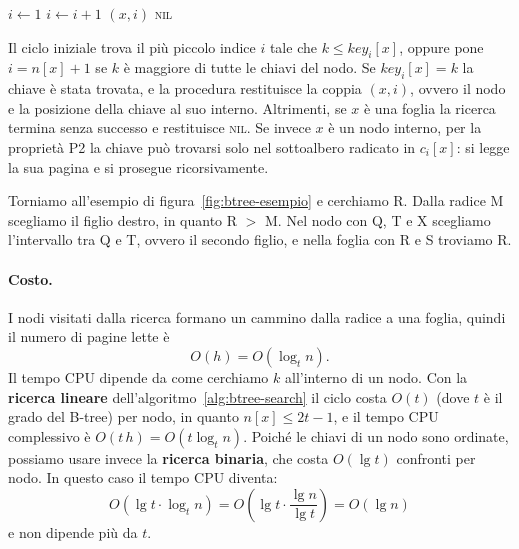 \begin{algorithm}[htbp]
\caption{La ricerca di $k$ nel sottoalbero radicato in $x$. La chiamata iniziale è \BTreeSearch$(\mathit{root}[T],k)$.}\label{alg:btree-search}
\begin{algorithmic}[1]
  \State $i \gets 1$
    \State $i \gets i+1$
  \EndWhile
    \State \Return $(x,i)$
  \EndIf
    \State \Return \textsc{nil}
  \EndIf
  \State {}
  \State \Return {}
\EndProcedure
\end{algorithmic}
\end{algorithm}

Il ciclo iniziale trova il più piccolo indice $i$ tale che $k \le \mathit{key}_i[x]$, oppure pone $i = n[x]+1$ se $k$ è maggiore di tutte le chiavi del nodo. Se $\mathit{key}_i[x] = k$ la chiave è stata trovata, e la procedura restituisce la coppia $(x,i)$, ovvero il nodo e la posizione della chiave al suo interno. Altrimenti, se $x$ è una foglia la ricerca termina senza successo e restituisce \textsc{nil}. Se invece $x$ è un nodo interno, per la proprietà P2 la chiave può trovarsi solo nel sottoalbero radicato in $c_i[x]$: si legge la sua pagina e si prosegue ricorsivamente.

Torniamo all'esempio di figura~\ref{fig:btree-esempio} e cerchiamo R. Dalla radice M scegliamo il figlio destro, in quanto R $>$ M. Nel nodo con Q, T e X scegliamo l'intervallo tra Q e T, ovvero il secondo figlio, e nella foglia con R e S troviamo R.

\paragraph{Costo.}
I nodi visitati dalla ricerca formano un cammino dalla radice a una foglia, quindi il numero di pagine lette è
\[
O(h) = O(\log_t n).
\]
Il tempo CPU dipende da come cerchiamo $k$ all'interno di un nodo. Con la \textbf{ricerca lineare} dell'algoritmo~\ref{alg:btree-search} il ciclo costa $O(t)$ (dove $t$ è il grado del B-tree) per nodo, in quanto $n[x] \le 2t-1$, e il tempo CPU complessivo è $O(t\,h) = O(t \log_t n)$. Poiché le chiavi di un nodo sono ordinate, possiamo usare invece la \textbf{ricerca binaria}, che costa $O(\lg t)$ confronti per nodo. In questo caso il tempo CPU diventa:
\[
O(\lg t \cdot \log_t n) = O\left(\lg t \cdot \frac{\lg n}{\lg t}\right) = O(\lg n)
\]
e non dipende più da $t$.

